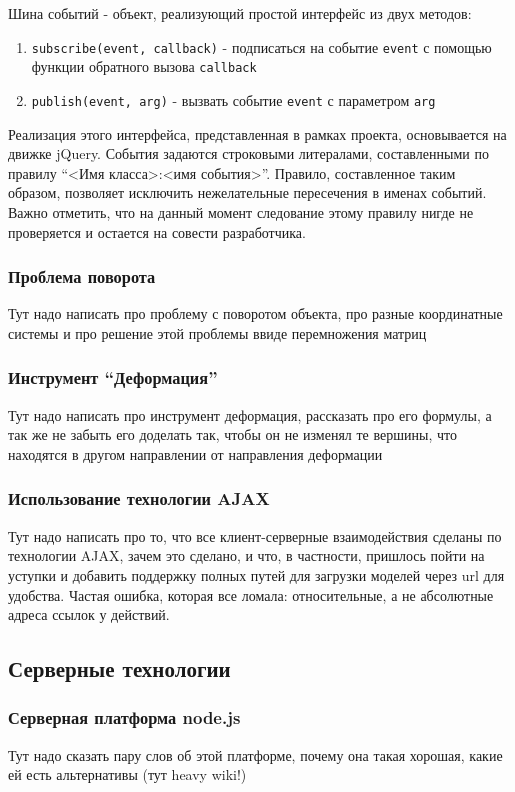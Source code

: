 \documentclass[12pt, a4paper]{article}
\begin{document}
Шина событий - объект, реализующий простой интерфейс из двух методов:
\begin{enumerate}
    \item \texttt{subscribe(event, callback)} - подписаться на событие
    \texttt{event} с помощью функции обратного вызова \texttt{callback}
    \item \texttt{publish(event, arg)} - вызвать событие
    \texttt{event} с параметром \texttt{arg}
\end{enumerate}

Реализация этого интерфейса, представленная в рамках проекта, основывается на
движке jQuery. События задаются строковыми литералами, составленными по правилу
``<Имя класса>:<имя события>''. Правило, составленное таким образом, позволяет
исключить нежелательные пересечения в именах событий. Важно отметить, что на
данный момент следование этому правилу нигде не проверяется и остается на
совести разработчика.

\subsubsection{Проблема поворота}
Тут надо написать про проблему с поворотом объекта, про разные
координатные системы и про решение этой проблемы ввиде перемножения
матриц
\subsubsection{Инструмент ``Деформация''}
Тут надо написать про инструмент деформация, рассказать про его формулы,
а так же не забыть его доделать так, чтобы он не изменял те вершины, что
находятся в другом направлении от направления деформации
\subsubsection{Использование технологии AJAX}
Тут надо написать про то, что все клиент-серверные взаимодействия сделаны по
технологии AJAX, зачем это сделано, и что, в частности, пришлось пойти на
уступки и добавить поддержку полных путей для загрузки моделей через url для
удобства. Частая ошибка, которая все ломала: относительные, а не абсолютные
адреса ссылок у действий.

\subsection{Серверные технологии}
\subsubsection{Серверная платформа node.js}
Тут надо сказать пару слов об этой платформе, почему она такая хорошая,
какие ей есть альтернативы (тут heavy wiki!)
\end{document}
